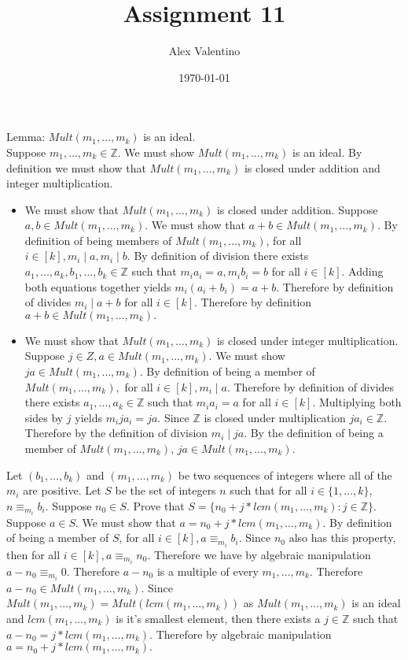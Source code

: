 \documentclass[12pt, letterpaper]{article}
\date{\today}
\author{Alex Valentino}
\title{Assignment 11}
\newcommand{\Z}{\mathbb{Z}}
\newcommand{\M}{Mult(m_1,\ldots,m_k)}
\begin{document}
Lemma: $Mult(m_1,\ldots,m_k)$ is an ideal.\\
	Suppose $m_1,\ldots,m_k\in \Z.$  We must show $Mult(m_1,\ldots,m_k)$ is an ideal.  By definition we must show that $Mult(m_1,\ldots,m_k)$ is closed under addition and integer multiplication.
	\begin{itemize}
		\item We must show that $Mult(m_1,\ldots,m_k)$ is closed under addition.  Suppose $a,b \in Mult(m_1,\ldots,m_k)$.  We must show that $a+b \in Mult(m_1,\ldots,m_k).$  By definition of being members of $Mult(m_1,\ldots,m_k)$, for all $i \in [k], m_i \mid a, m_i \mid b.$  By definition of division there exists $a_1,\ldots,a_k,b_1,\ldots,b_k \in \Z$ such that $m_i a_i = a, m_i b_i = b$ for all $i \in [k].$  Adding both equations together yields $m_i (a_i + b_i) = a+b.$  Therefore by definition of divides $m_i\mid a+b$ for all $i \in [k].$  Therefore by definition $a+b \in Mult(m_1,\ldots,m_k).$
		\item We must show that $Mult(m_1,\ldots,m_k)$ is closed under integer multiplication.  Suppose $j \in Z, a \in Mult(m_1,\ldots,m_k).$  We must show $ja \in \M.$  By definition of being a member of $\M,$ for all $i \in [k], m_i \mid a.$  Therefore by definition of divides there exists $a_1,\ldots,a_k \in \Z$ such that $m_i a_i = a$ for all $i \in [k].$  Multiplying both sides by $j$ yields $m_i j a_i = ja.$  Since $\Z$ is closed under multiplication $j a_i \in \Z.$  Therefore by the definition of division $m_i \mid ja.$  By the definition of being a member of $\M$, $ja \in \M.$   
	\end{itemize}

Let $(b_1,\ldots,b_k)$ and $(m_1,\ldots,m_k)$ be two sequences of integers where all of the $m_i$ are positive.
Let $S$ be the set of integers $n$ such that for all 
 $i \in \{1,\ldots,k\}$, $n \equiv_{m_i} b_i$.   Suppose $n_0 \in S$.  Prove that 
$S=\{n_0+j *lcm(m_1,\ldots,m_k): j \in \mathbb{Z}\}$.  Suppose $a \in S.$  We must show that $a = n_0 + j * lcm(m_1,\ldots,m_k).$  By definition of being a member of $S$, for all $i \in [k], a \equiv_{m_i} b_i.$  Since $n_0$ also has this property, then for all $i \in [k], a \equiv_{m_i} n_0$.  Therefore we have by algebraic manipulation $a - n_0 \equiv_{m_i} 0.$  Therefore $a-n_0$ is a multiple of every $m_1,\ldots,m_k.$  Therefore $a-n_0 \in Mult(m_1,\ldots,m_k)$.  Since $Mult(m_1,\ldots,m_k) = Mult(lcm(m_1,\ldots,m_k))$ as $\M$ is an ideal and $lcm(m_1,\ldots,m_k)$ is it's smallest element, then there exists a $j \in \Z$ such that $a - n_0 = j*lcm(m_1,\ldots,m_k).$  Therefore by algebraic manipulation $a = n_0 + j*lcm(m_1,\ldots,m_k).$
\end{document}
